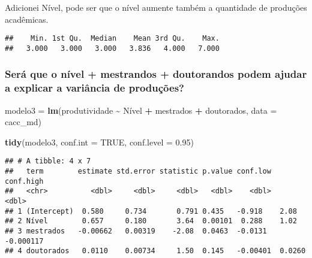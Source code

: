 \documentclass[
]{article}
\newenvironment{Shaded}{\begin{snugshade}}{\end{snugshade}}
\newcommand{\AttributeTok}[1]{\textcolor[rgb]{0.13,0.29,0.53}{#1}}
\newcommand{\ConstantTok}[1]{\textcolor[rgb]{0.56,0.35,0.01}{#1}}
\newcommand{\FloatTok}[1]{\textcolor[rgb]{0.00,0.00,0.81}{#1}}
\newcommand{\FunctionTok}[1]{\textcolor[rgb]{0.13,0.29,0.53}{\textbf{#1}}}
\newcommand{\NormalTok}[1]{#1}
\newcommand{\OtherTok}[1]{\textcolor[rgb]{0.56,0.35,0.01}{#1}}
\newcommand{\SpecialCharTok}[1]{\textcolor[rgb]{0.81,0.36,0.00}{\textbf{#1}}}
\begin{document}
Adicionei Nível, pode ser que o nível aumente também a quantidade de
produções acadêmicas.

\begin{Shaded}
\end{Shaded}

\begin{verbatim}
##    Min. 1st Qu.  Median    Mean 3rd Qu.    Max. 
##   3.000   3.000   3.000   3.836   4.000   7.000
\end{verbatim}

\hypertarget{seruxe1-que-o-nuxedvel-mestrandos-doutorandos-podem-ajudar-a-explicar-a-variuxe2ncia-de-produuxe7uxf5es}{%
\subsubsection{Será que o nível + mestrandos + doutorandos podem ajudar
a explicar a variância de
produções?}\label{seruxe1-que-o-nuxedvel-mestrandos-doutorandos-podem-ajudar-a-explicar-a-variuxe2ncia-de-produuxe7uxf5es}}

\begin{Shaded}
\begin{Highlighting}[]
\NormalTok{modelo3 }\OtherTok{=} \FunctionTok{lm}\NormalTok{(produtividade }\SpecialCharTok{\textasciitilde{}}\NormalTok{ Nível }\SpecialCharTok{+}\NormalTok{ mestrados }\SpecialCharTok{+}\NormalTok{ doutorados, }
             \AttributeTok{data =}\NormalTok{ cacc\_md)}

\FunctionTok{tidy}\NormalTok{(modelo3, }\AttributeTok{conf.int =} \ConstantTok{TRUE}\NormalTok{, }\AttributeTok{conf.level =} \FloatTok{0.95}\NormalTok{)}
\end{Highlighting}
\end{Shaded}

\begin{verbatim}
## # A tibble: 4 x 7
##   term        estimate std.error statistic p.value conf.low conf.high
##   <chr>          <dbl>     <dbl>     <dbl>   <dbl>    <dbl>     <dbl>
## 1 (Intercept)  0.580     0.734       0.791 0.435   -0.918    2.08    
## 2 Nível        0.657     0.180       3.64  0.00101  0.288    1.02    
## 3 mestrados   -0.00662   0.00319    -2.08  0.0463  -0.0131  -0.000117
## 4 doutorados   0.0110    0.00734     1.50  0.145   -0.00401  0.0260
\end{verbatim}
\end{document}
